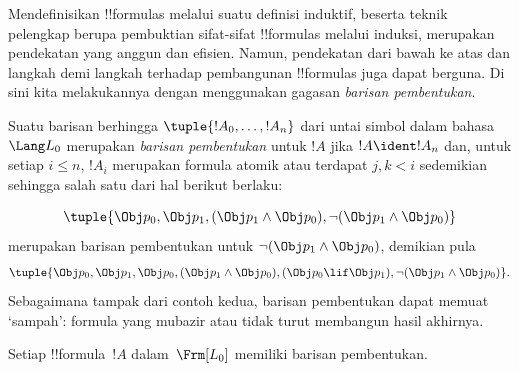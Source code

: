 \documentclass[../../../include/open-logic-section]{subfiles}
\begin{document}


Mendefinisikan !!{formula}s melalui suatu definisi induktif, beserta teknik
pelengkap berupa pembuktian sifat-sifat !!{formula}s melalui induksi,
merupakan pendekatan yang anggun dan efisien. Namun, pendekatan dari bawah
ke atas dan langkah demi langkah terhadap pembangunan !!{formula}s juga
dapat berguna. Di sini kita melakukannya dengan menggunakan gagasan
\emph{barisan pembentukan}.

\begin{defn}
Suatu barisan berhingga $\tuple{!A_0,\dotsc,!A_n}$ dari untai simbol dalam
bahasa~$\Lang L_0$ merupakan \emph{barisan pembentukan} untuk $!A$ jika
$!A \ident !A_n$ dan, untuk setiap $i \leq n$, $!A_i$ merupakan formula
atomik atau terdapat $j,k < i$ sedemikian sehingga salah satu dari hal
berikut berlaku:
\begin{enumerate}
\end{enumerate}
\end{defn}

\begin{ex}
\[
\tuple{
    \Obj p_0,
    \Obj p_1,
    (\Obj p_1 \land \Obj p_0),
    \lnot (\Obj p_1 \land \Obj p_0)
}
\]
merupakan barisan pembentukan untuk
$\lnot (\Obj p_1 \land \Obj p_0)$, demikian pula
\[
\tuple{
    \Obj p_0,
    \Obj p_1,
    \Obj p_0,
    (\Obj p_1 \land \Obj p_0),
    (\Obj p_0 \lif \Obj p_1),
    \lnot (\Obj p_1 \land \Obj p_0)
}.
\]
%
Sebagaimana tampak dari contoh kedua, barisan pembentukan dapat memuat
`sampah': formula yang mubazir atau tidak turut membangun hasil akhirnya.
\end{ex}

\begin{prop}
Setiap !!{formula}~$!A$ dalam~$\Frm[L_0]$ memiliki barisan pembentukan.
\end{prop}
\end{document}
